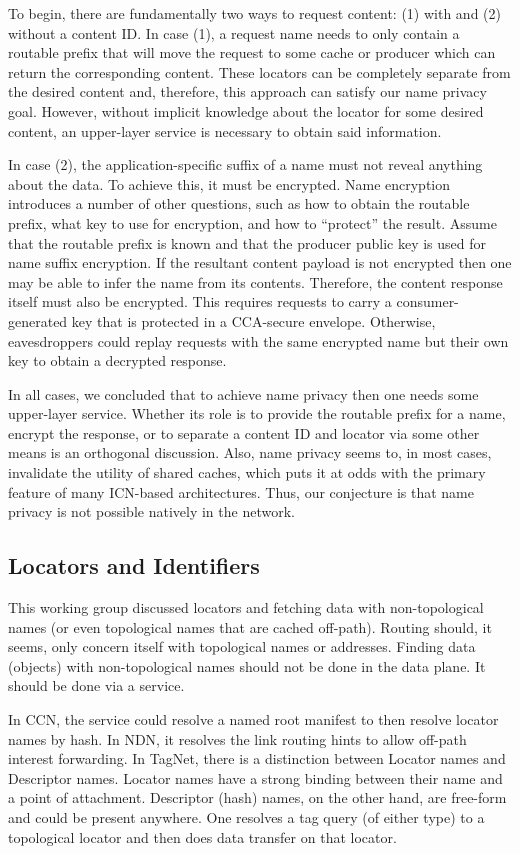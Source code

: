 \documentclass{sig-alternate-10pt}
\begin{document}
To begin, there are fundamentally two ways to request content: (1) with and (2) without a content ID. In case (1), a request name needs to only contain a routable prefix that will move the request to some cache or producer which can return the corresponding content. These locators can be completely separate from the desired content and, therefore, this approach can satisfy our name privacy goal. However, without implicit knowledge about the locator for some desired content, an upper-layer service is necessary to obtain said information.

In case (2), the application-specific suffix of a name must not reveal anything about the data. To achieve this, it must be encrypted. Name encryption introduces a number of other questions, such as how to obtain the routable prefix, what key to use for encryption, and how to ``protect'' the result. Assume that the routable prefix is known and that the producer public key is used for name suffix encryption. If the resultant content payload is not encrypted then one may be able to infer the name from its contents. Therefore, the content response itself must also be encrypted. This requires requests to carry a consumer-generated key that is protected in a CCA-secure envelope. Otherwise, eavesdroppers could replay requests with the same encrypted name but their own key to obtain a decrypted response.

In all cases, we concluded that to achieve name privacy then one needs some upper-layer service. Whether its role is to provide the routable prefix for a name, encrypt the response, or to separate a content ID and locator via some other means is an orthogonal discussion. Also, name privacy seems to, in most cases, invalidate the utility of shared caches, which puts it at odds with the primary feature of many ICN-based architectures. Thus, our conjecture is that name privacy is not possible natively in the network.


\subsection{Locators and Identifiers}
This working group discussed locators and fetching data with non-topological names (or even topological names that are cached off-path). Routing should, it seems, only concern itself with topological names or addresses.  Finding data (objects) with non-topological names should not be done in the data plane.  It should be done via a service.

In CCN, the service could resolve a named root manifest to then resolve locator names by hash.
In NDN, it resolves the link routing hints to allow off-path interest forwarding. In TagNet,
there is a distinction between Locator names and Descriptor names. Locator names have a
strong binding between their name and a point of attachment. Descriptor (hash) names, on the
other hand, are free-form and could be present anywhere.  One resolves a tag query (of either
type) to a topological locator and then does data transfer on that locator.
\end{document}
